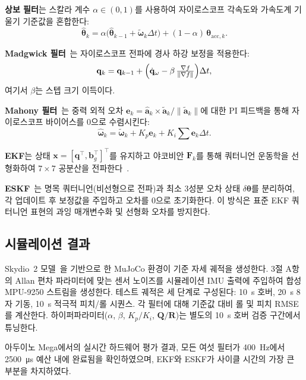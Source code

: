 \textbf{상보 필터}는 스칼라 계수 $\alpha \in (0,1)$를 사용하여
자이로스코프 각속도와 가속도계 기울기 기준값을 혼합한다:
\begin{equation}
    \hat{\boldsymbol{\theta}}_k = \alpha\bigl(\hat{\boldsymbol{\theta}}_{k-1}+\tilde{\boldsymbol{\omega}}_k\Delta t\bigr)
    + (1-\alpha)\,\boldsymbol{\theta}_{\mathrm{acc},k}.
\end{equation}

\textbf{Madgwick 필터}~\cite{madgwick2011}는 자이로스코프 전파에 경사 하강 보정을 적용한다:
\begin{equation}
    \mathbf{q}_k = \mathbf{q}_{k-1} +
    \Bigl(\dot{\mathbf{q}}_\omega - \beta\,\tfrac{\nabla f}{\|\nabla f\|}\Bigr)\Delta t,
\end{equation}
여기서 $\beta$는 스텝 크기 이득이다.

\textbf{Mahony 필터}~\cite{mahony2008}는 중력 외적 오차
$\mathbf{e}_k = \hat{\mathbf{a}}_k \times \tilde{\mathbf{a}}_k/\|\tilde{\mathbf{a}}_k\|$에 대한
PI 피드백을 통해 자이로스코프 바이어스를 0으로 수렴시킨다:
\begin{equation}
    \hat{\boldsymbol{\omega}}_k = \tilde{\boldsymbol{\omega}}_k + K_p\mathbf{e}_k + K_i\textstyle\sum\mathbf{e}_k\Delta t.
\end{equation}

\textbf{EKF}는 상태 $\mathbf{x}=[\mathbf{q}^\top,\mathbf{b}_g^\top]^\top$를 유지하고
야코비안 $\mathbf{F}_k$를 통해 쿼터니언 운동학을 선형화하여
$7{\times}7$ 공분산을 전파한다~\cite{bar-shalom2001}.

\textbf{ESKF}~\cite{sola2017}는 명목 쿼터니언(비선형으로 전파)과
최소 3성분 오차 상태 $\delta\boldsymbol{\theta}$를 분리하여,
각 업데이트 후 보정값을 주입하고 오차를 0으로 초기화한다.
이 방식은 표준 EKF 쿼터니언 표현의 과잉 매개변수화 및 선형화 오차를 방지한다.

\subsection{시뮬레이션 결과}

Skydio~2 모델~\cite{deepmind2022}을 기반으로 한 MuJoCo 환경이 기준 자세 궤적을 생성한다.
3절 A항의 Allan 편차 파라미터에 맞는 센서 노이즈를 시뮬레이션 IMU 출력에 주입하여
합성 MPU-9250 스트림을 생성한다.
테스트 궤적은 세 단계로 구성된다: \SI{10}{\second} 호버, \SI{20}{\second} 8자 기동,
\SI{10}{\second} 적극적 피치/롤 시퀀스.
각 필터에 대해 기준값 대비 롤 및 피치 RMSE를 계산한다.
하이퍼파라미터($\alpha$, $\beta$, $K_p/K_i$, $\mathbf{Q}/\mathbf{R}$)는
별도의 \SI{10}{\second} 호버 검증 구간에서 튜닝한다.


아두이노 Mega에서의 실시간 하드웨어 평가 결과,
모든 여섯 필터가 \SI{400}{\hertz}에서 \SI{2500}{\micro\second} 예산 내에 완료됨을 확인하였으며,
EKF와 ESKF가 사이클 시간의 가장 큰 부분을 차지하였다.

